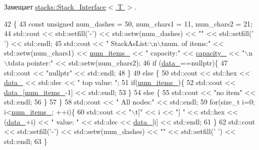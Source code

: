 Замещает \hyperlink{classstacks_1_1_stack___interface_a0d7472426e55bd2f093d03c8d3e24d7e}{stacks\+::\+Stack\+\_\+\+Interface$<$ T $>$}.


\begin{DoxyCode}
42                                    \{
43         \textcolor{keyword}{const} \textcolor{keywordtype}{unsigned} num\_dashes = 50, num\_chars1 = 11, num\_chars2 = 21;
44         std::cout << std::setfill(\textcolor{charliteral}{'-'}) << std::setw(num\_dashes) << \textcolor{stringliteral}{""} << std::setfill(\textcolor{charliteral}{' '}) << std::endl;
45         std::cout << \textcolor{stringliteral}{"   StackAsList:\(\backslash\)n\(\backslash\)tnum. of items:"} << std::setw(num\_chars1) << 
      \hyperlink{classstacks_1_1_stack_as_mass_a3adff034672496130598a225d4a4bc0f}{num\_items\_} << \textcolor{stringliteral}{" capacity:"} << \hyperlink{classstacks_1_1_stack_as_mass_ab49914ac7b7561f4187f1356a0a4e5ee}{capacity\_} << \textcolor{stringliteral}{"\(\backslash\)n\(\backslash\)tdata pointer:"} << std::setw(num\_chars2);
46         \textcolor{keywordflow}{if} (\hyperlink{classstacks_1_1_stack_as_mass_a1359a096829b400cd4d496cfe6e2fabc}{data\_}==\textcolor{keyword}{nullptr})\{
47             std::cout << \textcolor{stringliteral}{"nullptr"} << std::endl;
48         \}
49         \textcolor{keywordflow}{else} \{
50             std::cout << std::hex << \hyperlink{classstacks_1_1_stack_as_mass_a1359a096829b400cd4d496cfe6e2fabc}{data\_} << std::dec << \textcolor{stringliteral}{" top value: "};
51             \textcolor{keywordflow}{if}(\hyperlink{classstacks_1_1_stack_as_mass_a3adff034672496130598a225d4a4bc0f}{num\_items\_})\{
52                 std::cout << \hyperlink{classstacks_1_1_stack_as_mass_a1359a096829b400cd4d496cfe6e2fabc}{data\_}[\hyperlink{classstacks_1_1_stack_as_mass_a3adff034672496130598a225d4a4bc0f}{num\_items\_}-1] << std::endl;
53             \}
54             \textcolor{keywordflow}{else} \{
55                 std::cout << \textcolor{stringliteral}{"no item"} << std::endl;
56             \}
57         \}
58         std::cout << \textcolor{stringliteral}{"    All nodes:"} << std::endl;
59         \textcolor{keywordflow}{for}(\textcolor{keywordtype}{size\_t} i=0; i<\hyperlink{classstacks_1_1_stack_as_mass_a3adff034672496130598a225d4a4bc0f}{num\_items\_}; ++i)\{
60             std::cout << \textcolor{stringliteral}{"\(\backslash\)t["} << i << \textcolor{stringliteral}{"] "} << std::hex << (\hyperlink{classstacks_1_1_stack_as_mass_a1359a096829b400cd4d496cfe6e2fabc}{data\_}+i) << \textcolor{stringliteral}{" value: "} << std::dec << 
      \hyperlink{classstacks_1_1_stack_as_mass_a1359a096829b400cd4d496cfe6e2fabc}{data\_}[i] << std::endl;
61         \}
62         std::cout << std::setfill(\textcolor{charliteral}{'-'}) << std::setw(num\_dashes) << \textcolor{stringliteral}{""} << std::setfill(\textcolor{charliteral}{' '}) << std::endl;
63     \}
\end{DoxyCode}
\hypertarget{classstacks_1_1_stack_as_mass_a0e8e793c3f09ebe95679a4a588f7973d}{}
